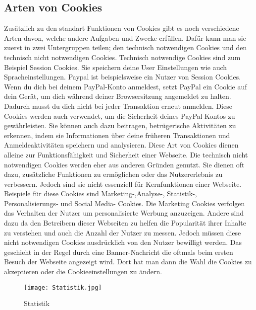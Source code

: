 \documentclass{article}
\begin{document}
\subsection{Arten von Cookies}
Zusätzlich zu den standart Funktionen von Cookies gibt es noch verschiedene Arten davon, welche andere Aufgaben und Zwecke erfüllen. Dafür kann man sie zuerst in zwei Untergruppen teilen; den technisch notwendigen Cookies und den technisch nicht notwendigen Cookies. 
Technisch notwendige Cookies sind zum Beispiel Session Cookies. Sie speichern deine User Einstellungen wie auch Spracheinstellungen. Paypal ist beispielsweise ein Nutzer von Session Cookies. Wenn du dich bei deinem PayPal-Konto anmeldest, setzt PayPal ein Cookie auf dein Gerät, um dich während deiner Browsersitzung angemeldet zu halten. Dadurch musst du dich nicht bei jeder Transaktion erneut anmelden.
Diese Cookies werden auch verwendet, um die Sicherheit deines PayPal-Kontos zu gewährleisten. Sie können auch dazu beitragen, betrügerische Aktivitäten zu erkennen, indem sie Informationen über deine früheren Transaktionen und Anmeldeaktivitäten speichern und analysieren. Diese Art von Cookies dienen alleine zur Funktionsfähigkeit und Sicherheit einer Webseite.
Die technisch nicht notwendigen Cookies werden eher aus anderen Gründen genutzt. Sie dienen oft dazu, zusätzliche Funktionen zu ermöglichen oder das Nutzererlebnis zu verbessern. Jedoch sind sie nicht essenziell für Kernfunktionen einer Webseite. Beispiele für diese Cookies sind Marketing-,Analyse-, Statistik-, Personalisierungs- und Social Media- Cookies. Die Marketing Cookies verfolgen das Verhalten der Nutzer um personalisierte Werbung anzuzeigen. Andere sind dazu da den Betreibern dieser Webseiten zu helfen die Popularität ihrer Inhalte zu verstehen und auch die Anzahl der Nutzer zu messen. Jedoch müssen diese nicht notwendigen Cookies ausdrücklich von den Nutzer bewilligt werden. Das geschieht in der Regel durch eine Banner-Nachricht die oftmals beim ersten Besuch der Webseite angezeigt wird. Dort hat man dann die Wahl die Cookies zu akzeptieren oder die Cookieeinstellungen zu ändern.


 
\begin{figure}[ht]
    \centering
    \texttt{[image: Statistik.jpg]}
    \caption{Statistik}
    \label{fig:Statistik}
    \end{figure}
 
\end{document}

